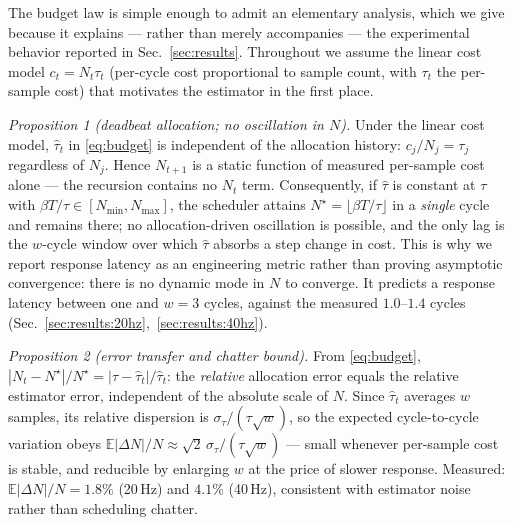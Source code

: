 \documentclass[conference]{IEEEtran}
\begin{document}
The budget law is simple enough to admit an elementary analysis, which
we give because it explains --- rather than merely accompanies --- the
experimental behavior reported in Sec.~\ref{sec:results}. Throughout we
assume the linear cost model $c_t = N_t \tau_t$ (per-cycle cost
proportional to sample count, with $\tau_t$ the per-sample cost) that
motivates the estimator in the first place.

\emph{Proposition 1 (deadbeat allocation; no oscillation in $N$).}
Under the linear cost model, $\hat{\tau}_t$ in \eqref{eq:budget} is
independent of the allocation history: $c_j / N_j = \tau_j$ regardless
of $N_j$. Hence $N_{t+1}$ is a static function of measured per-sample
cost alone --- the recursion contains no $N_t$ term. Consequently, if
$\hat{\tau}$ is constant at $\tau$ with $\beta T/\tau \in [N_{\min},
N_{\max}]$, the scheduler attains $N^\star = \lfloor \beta T/\tau
\rfloor$ in a \emph{single} cycle and remains there; no
allocation-driven oscillation is possible, and the only lag is the
$w$-cycle window over which $\hat{\tau}$ absorbs a step change in cost.
This is why we report response latency as an engineering metric rather
than proving asymptotic convergence: there is no dynamic mode in $N$ to
converge. It predicts a response latency between one and $w = 3$
cycles, against the measured $1.0$--$1.4$ cycles
(Sec.~\ref{sec:results:20hz},~\ref{sec:results:40hz}).

\emph{Proposition 2 (error transfer and chatter bound).} From
\eqref{eq:budget}, $|N_t - N^\star| / N^\star = |\tau -
\hat{\tau}_t| / \hat{\tau}_t$: the \emph{relative} allocation error
equals the relative estimator error, independent of the absolute scale
of $N$. Since $\hat{\tau}_t$ averages $w$ samples, its relative
dispersion is $\sigma_\tau / (\tau \sqrt{w})$, so the expected
cycle-to-cycle variation obeys $\mathbb{E}|\Delta N| / N \approx
\sqrt{2}\, \sigma_\tau / (\tau\sqrt{w})$ --- small whenever per-sample
cost is stable, and reducible by enlarging $w$ at the price of slower
response. Measured: $\mathbb{E}|\Delta N|/N = 1.8\%$ (20\,Hz) and
$4.1\%$ (40\,Hz), consistent with estimator noise rather than
scheduling chatter.
\end{document}
